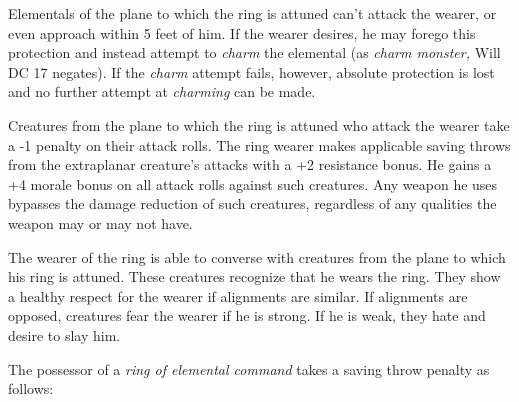 Elementals of the plane to which the ring is attuned can't attack the wearer, or 
even approach within 5 feet of him. If the wearer desires, he may forego this protection 
and instead attempt to \textit{charm }the elemental (as \textit{charm monster, 
}Will DC 17 negates). If the \textit{charm }attempt fails, however, absolute protection 
is lost and no further attempt at \textit{charming }can be made.

Creatures from the plane to which the ring is attuned who attack the wearer take 
a -1 penalty on their attack rolls. The ring wearer makes applicable saving throws 
from the extraplanar creature's attacks with a +2 resistance bonus. He gains a 
+4 morale bonus on all attack rolls against such creatures. Any weapon he uses 
bypasses the damage reduction of such creatures, regardless of any qualities the 
weapon may or may not have.

The wearer of the ring is able to converse with creatures from the plane to which 
his ring is attuned. These creatures recognize that he wears the ring. They show 
a healthy respect for the wearer if alignments are similar. If alignments are opposed, 
creatures fear the wearer if he is strong. If he is weak, they hate and desire 
to slay him.

The possessor of a \textit{ring of elemental command }takes a saving throw penalty 
as follows:

